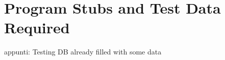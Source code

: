 \newpage
\section{Program Stubs and Test Data Required}
appunti: Testing DB already filled with some data